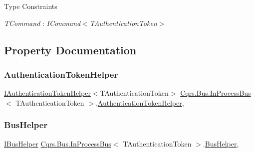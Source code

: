 \begin{Desc}
\item[Type Constraints]\begin{description}
\item[{\em T\+Command} : {\em I\+Command$<$T\+Authentication\+Token$>$}]\end{description}
\end{Desc}


\subsection{Property Documentation}
\mbox{\label{classCqrs_1_1Bus_1_1InProcessBus_a20d068b944183ab04e77c3164d19a860_a20d068b944183ab04e77c3164d19a860}} 
\subsubsection{\texorpdfstring{Authentication\+Token\+Helper}{AuthenticationTokenHelper}}
{\footnotesize\ttfamily \hyperlink{interfaceCqrs_1_1Authentication_1_1IAuthenticationTokenHelper}{I\+Authentication\+Token\+Helper}$<$T\+Authentication\+Token$>$ \hyperlink{classCqrs_1_1Bus_1_1InProcessBus}{Cqrs.\+Bus.\+In\+Process\+Bus}$<$ T\+Authentication\+Token $>$.\hyperlink{classCqrs_1_1Authentication_1_1AuthenticationTokenHelper}{Authentication\+Token\+Helper}\hspace{0.3cm}{\ttfamily [get]}, {\ttfamily [protected]}}

\mbox{\label{classCqrs_1_1Bus_1_1InProcessBus_a5dd1cb40277f3e04e743dd8cd63523ff_a5dd1cb40277f3e04e743dd8cd63523ff}} 
\subsubsection{\texorpdfstring{Bus\+Helper}{BusHelper}}
{\footnotesize\ttfamily \hyperlink{interfaceCqrs_1_1Bus_1_1IBusHelper}{I\+Bus\+Helper} \hyperlink{classCqrs_1_1Bus_1_1InProcessBus}{Cqrs.\+Bus.\+In\+Process\+Bus}$<$ T\+Authentication\+Token $>$.\hyperlink{classCqrs_1_1Bus_1_1BusHelper}{Bus\+Helper}\hspace{0.3cm}{\ttfamily [get]}, {\ttfamily [protected]}}

